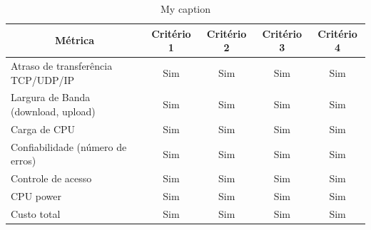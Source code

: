 \documentclass[conference]{IEEEtran}
\begin{document}
\begin{table}[]
\centering
\caption{My caption}
\label{my-label}
\begin{tabular}{|l|c|c|c|c|}
\hline
\multicolumn{1}{|c|}{\cellcolor[HTML]{FFFFFF}\textbf{Métrica}} & \textbf{Critério 1}         & \textbf{Critério 2}                                & \textbf{Critério 3}                                & \textbf{Critério 4}                              \\ \hline
Atraso de transferência TCP/UDP/IP                             & Sim                         & Sim                                                & Sim                                                & Sim                                              \\ \hline
Largura de Banda (download, upload)                            & Sim                         & Sim                                                & Sim                                                & Sim                                              \\ \hline
Carga de CPU                                                   & Sim                         & Sim                                                & Sim                                                & Sim                                              \\ \hline
Confiabilidade (número de erros)                               & Sim                         & Sim                                                & Sim                                                & Sim                                              \\ \hline
Controle de acesso                                             & Sim                         & Sim                                                & Sim                                                & Sim                                              \\ \hline
CPU power                                                      & Sim                         & Sim                                                & Sim                                                & Sim                                              \\ \hline
Custo total                                                    & Sim                         & Sim                                                & Sim                                                & Sim                                              \\ \hline

\end{tabular}
\end{table}
\end{document}
